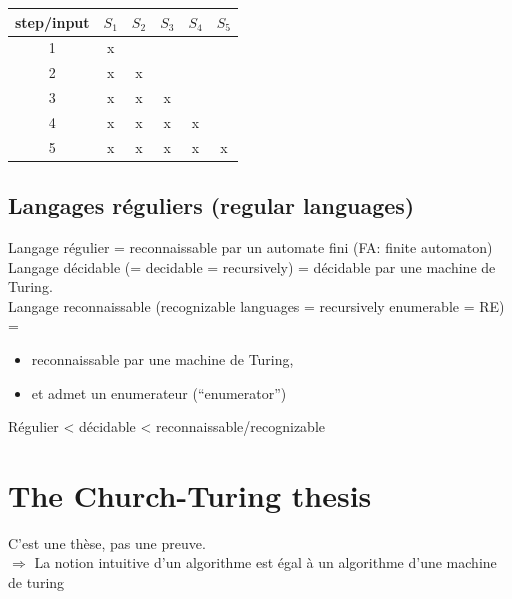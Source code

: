 \documentclass[a4paper,12pt]{article}
\begin{document}
      \begin{table}[h]
	\centering
	\begin{tabular}{c|ccccc}
	step/input & $S_1$                  & $S_2$                  & $S_3$                  & $S_4$                  & $S_5$ \\ \hline
	1          & \multicolumn{1}{c|}{x} &                        &                        &                        &       \\ \cline{3-3}
	2          & x                      & \multicolumn{1}{c|}{x} &                        &                        &       \\ \cline{4-4}
	3          & x                      & x                      & \multicolumn{1}{c|}{x} &                        &       \\ \cline{5-5}
	4          & x                      & x                      & x                      & \multicolumn{1}{c|}{x} &       \\ \cline{6-6}
	5          & x                      & x                      & x                      & x                      & x
	\end{tabular}
      \end{table}

  \subsection{Langages réguliers (regular languages)}
    Langage régulier = reconnaissable par un automate fini (FA: finite automaton)\\
    Langage décidable (= decidable = recursively) = décidable par une machine de Turing.\\
    Langage reconnaissable (recognizable languages = recursively enumerable = RE) =
    \begin{itemize}
      \item reconnaissable par une machine de Turing,
      \item et admet un enumerateur (``enumerator'')
    \end{itemize}

    Régulier < décidable < reconnaissable/recognizable


\section{The Church-Turing thesis}
  C'est une thèse, pas une preuve.\\
  $\Rightarrow$ La notion intuitive d'un algorithme est égal à un algorithme d'une machine de turing\\
\end{document}
